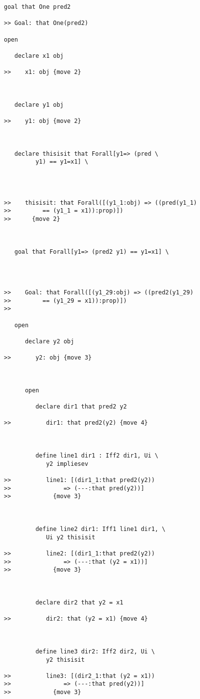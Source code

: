 \documentclass[12pt]{article}
\begin{document}
\begin{verbatim}
goal that One pred2

>> Goal: that One(pred2)

open

   declare x1 obj

>>    x1: obj {move 2}



   declare y1 obj

>>    y1: obj {move 2}



   declare thisisit that Forall[y1=> (pred \
         y1) == y1=x1] \
      



>>    thisisit: that Forall([(y1_1:obj) => ((pred(y1_1)
>>         == (y1_1 = x1)):prop)])
>>      {move 2}



   goal that Forall[y1=> (pred2 y1) == y1=x1] \
      



>>    Goal: that Forall([(y1_29:obj) => ((pred2(y1_29)
>>         == (y1_29 = x1)):prop)])
>>      

   open

      declare y2 obj

>>       y2: obj {move 3}



      open

         declare dir1 that pred2 y2

>>          dir1: that pred2(y2) {move 4}



         define line1 dir1 : Iff2 dir1, Ui \
            y2 impliesev

>>          line1: [(dir1_1:that pred2(y2))
>>               => (---:that pred(y2))]
>>            {move 3}



         define line2 dir1: Iff1 line1 dir1, \
            Ui y2 thisisit

>>          line2: [(dir1_1:that pred2(y2))
>>               => (---:that (y2 = x1))]
>>            {move 3}



         declare dir2 that y2 = x1

>>          dir2: that (y2 = x1) {move 4}



         define line3 dir2: Iff2 dir2, Ui \
            y2 thisisit

>>          line3: [(dir2_1:that (y2 = x1))
>>               => (---:that pred(y2))]
>>            {move 3}




\end{verbatim}
\end{document}
